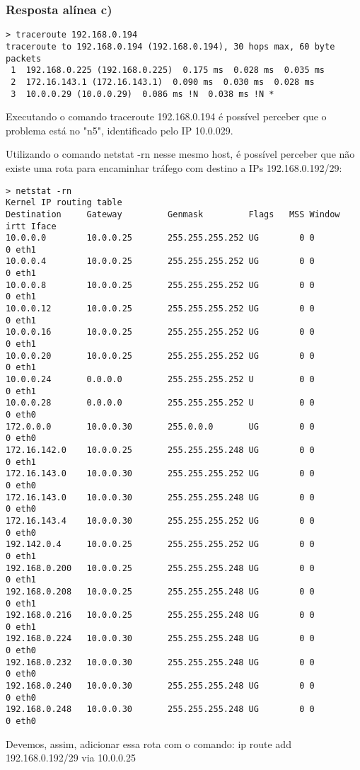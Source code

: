 \documentclass{article}
\begin{document}
\subsubsection{Resposta alínea c)}
\begin{lstlisting}
> traceroute 192.168.0.194                           
traceroute to 192.168.0.194 (192.168.0.194), 30 hops max, 60 byte packets
 1  192.168.0.225 (192.168.0.225)  0.175 ms  0.028 ms  0.035 ms
 2  172.16.143.1 (172.16.143.1)  0.090 ms  0.030 ms  0.028 ms
 3  10.0.0.29 (10.0.0.29)  0.086 ms !N  0.038 ms !N *
\end{lstlisting}
Executando o comando traceroute 192.168.0.194 é possível perceber que o problema está no "n5", identificado pelo IP 10.0.029.

Utilizando o comando netstat -rn nesse mesmo host, é possível perceber que não existe uma rota para encaminhar tráfego com destino a IPs 192.168.0.192/29:
\begin{lstlisting}
> netstat -rn
Kernel IP routing table
Destination     Gateway         Genmask         Flags   MSS Window  irtt Iface
10.0.0.0        10.0.0.25       255.255.255.252 UG        0 0          0 eth1
10.0.0.4        10.0.0.25       255.255.255.252 UG        0 0          0 eth1
10.0.0.8        10.0.0.25       255.255.255.252 UG        0 0          0 eth1
10.0.0.12       10.0.0.25       255.255.255.252 UG        0 0          0 eth1
10.0.0.16       10.0.0.25       255.255.255.252 UG        0 0          0 eth1
10.0.0.20       10.0.0.25       255.255.255.252 UG        0 0          0 eth1
10.0.0.24       0.0.0.0         255.255.255.252 U         0 0          0 eth1
10.0.0.28       0.0.0.0         255.255.255.252 U         0 0          0 eth0
172.0.0.0       10.0.0.30       255.0.0.0       UG        0 0          0 eth0
172.16.142.0    10.0.0.25       255.255.255.248 UG        0 0          0 eth1
172.16.143.0    10.0.0.30       255.255.255.252 UG        0 0          0 eth0
172.16.143.0    10.0.0.30       255.255.255.248 UG        0 0          0 eth0
172.16.143.4    10.0.0.30       255.255.255.252 UG        0 0          0 eth0
192.142.0.4     10.0.0.25       255.255.255.252 UG        0 0          0 eth1
192.168.0.200   10.0.0.25       255.255.255.248 UG        0 0          0 eth1
192.168.0.208   10.0.0.25       255.255.255.248 UG        0 0          0 eth1
192.168.0.216   10.0.0.25       255.255.255.248 UG        0 0          0 eth1
192.168.0.224   10.0.0.30       255.255.255.248 UG        0 0          0 eth0
192.168.0.232   10.0.0.30       255.255.255.248 UG        0 0          0 eth0
192.168.0.240   10.0.0.30       255.255.255.248 UG        0 0          0 eth0
192.168.0.248   10.0.0.30       255.255.255.248 UG        0 0          0 eth0
\end{lstlisting}
Devemos, assim, adicionar essa rota com o comando: ip route add 192.168.0.192/29 via 10.0.0.25
\end{document}
